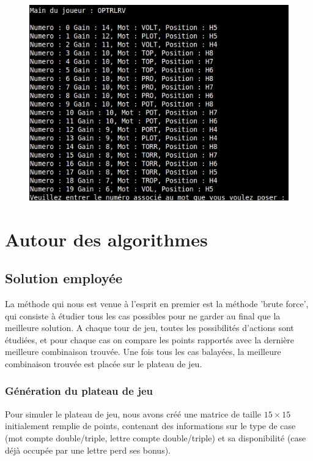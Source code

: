 \documentclass[a4paper,8pt,french,fleqn]{article}
\begin{document}
\begin{figure}[h]
  \begin{center}
    \vspace{0.2cm}
    \includegraphics[scale=0.5]{choix.png}
  \end{center}
\end{figure}

\newpage

\section{Autour des algorithmes}

\subsection{Solution employée}

La méthode qui nous est venue à l'esprit en premier est la méthode 'brute force', qui consiste à étudier tous les cas possibles pour ne garder au final que la meilleure solution. A chaque tour de jeu, toutes les possibilités d'actions sont étudiées, et pour chaque cas on compare les points rapportés avec la dernière meilleure combinaison trouvée. Une fois tous les cas balayées, la meilleure combinaison trouvée est placée sur le plateau de jeu. \\ 

\subsubsection{Génération du plateau de jeu}

Pour simuler le plateau de jeu, nous avons créé une matrice de taille $15 \times 15$ initialement remplie de points, contenant des informations sur le type de case (mot compte double/triple, lettre compte double/triple) et sa disponibilité (case déjà occupée par une lettre perd ses bonus). 
\end{document}
